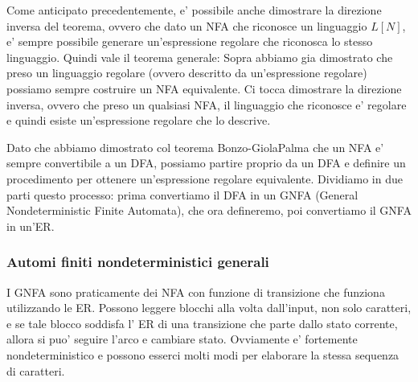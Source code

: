Come anticipato precedentemente, e' possibile anche dimostrare la direzione inversa del teorema, ovvero che dato un NFA che riconosce un linguaggio $ L[N] $, e' sempre possibile generare un'espressione regolare che riconosca lo stesso linguaggio. Quindi vale il teorema generale:
Sopra abbiamo gia dimostrato che preso un linguaggio regolare (ovvero descritto da un'espressione regolare) possiamo sempre costruire un NFA equivalente. Ci tocca dimostrare la direzione inversa, ovvero che preso un qualsiasi NFA, il linguaggio che riconosce e' regolare e quindi esiste un'espressione regolare che lo descrive.

Dato che abbiamo dimostrato col teorema Bonzo-GiolaPalma che un NFA e' sempre convertibile a un DFA, possiamo partire proprio da un DFA e definire un procedimento per ottenere un'espressione regolare equivalente. Dividiamo in due parti questo processo: prima convertiamo il DFA in un GNFA (General Nondeterministic Finite Automata), che ora defineremo, poi convertiamo il GNFA in un'ER.

\subsubsection{Automi finiti nondeterministici generali}
I GNFA sono praticamente dei NFA con funzione di transizione che funziona utilizzando le ER. Possono leggere blocchi alla volta dall'input, non solo caratteri, e se tale blocco soddisfa l' ER di una transizione che parte dallo stato corrente, allora si puo' seguire l'arco e cambiare stato. Ovviamente e' fortemente nondeterministico e possono esserci molti modi per elaborare la stessa sequenza di caratteri. 

